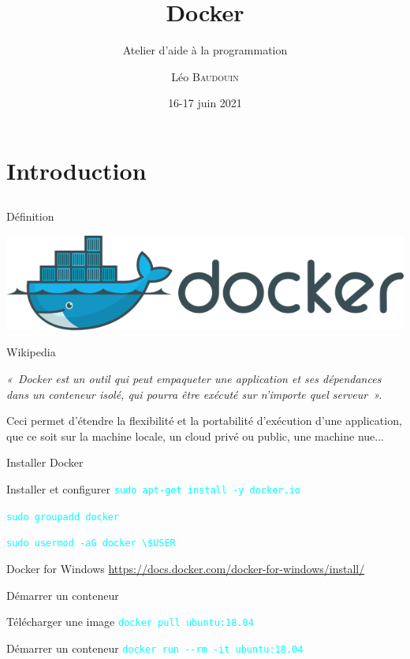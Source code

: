 \documentclass{beamer}
\title{Docker}
\subtitle{Atelier d'aide à la programmation}
\author{L\'eo \textsc{Baudouin}}
\institute{
  {\url{baudouin.leo @ gmail.com}}
}
\date{16-17 juin 2021}
\begin{document}
\begin{frame}
  \titlepage
\end{frame}

\section{Introduction}
\subsection{}

\begin{frame}{Définition}


\begin{center}
\includegraphics[width=0.5\linewidth]{images/docker-logo}
\end{center}

\begin{block}{Wikipedia}
{\it 
«~Docker est un outil qui peut empaqueter une application et ses dépendances dans un conteneur isolé, qui pourra être exécuté sur n'importe quel serveur~».

Ceci permet d'étendre la flexibilité et la portabilité d’exécution d'une application, que ce soit sur la machine locale, un cloud privé ou public, une machine nue...}
\end{block}
\end{frame}


\begin{frame}[fragile]{Installer Docker}

\begin{block}{Installer et configurer}
\textcolor{cyan}{\verb?sudo apt-get install -y docker.io?}

\textcolor{cyan}{\verb?sudo groupadd docker?}

\textcolor{cyan}{\verb?sudo usermod -aG docker \$USER?}
\end{block}

\begin{block}{Docker for Windows}
\href{https://docs.docker.com/docker-for-windows/install/}{https://docs.docker.com/docker-for-windows/install/}
\end{block}

\end{frame}


\begin{frame}{Démarrer un conteneur}

\begin{block}{Télécharger une image}
\textcolor{cyan}{\verb?docker pull ubuntu:18.04?}
\end{block}

\begin{block}{Démarrer un conteneur}
\textcolor{cyan}{\verb?docker run --rm -it ubuntu:18.04?}
\end{block}

\end{frame}
\end{document}
